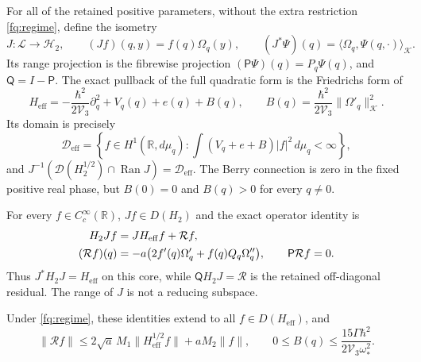 \begin{theorem}
\label{fq:projection}
For all of the retained positive parameters, without the extra
restriction \eqref{fq:regime}, define the isometry
\[
 J:\mathscr L\longrightarrow\mathscr H_2,\qquad
 (Jf)(q,y)=f(q)\Omega_q(y),\qquad
 (J^*\Psi)(q)=\langle\Omega_q,\Psi(q,\cdot)\rangle_{\mathscr K}.
\]
Its range projection is the fibrewise projection
$(\mathsf P\Psi)(q)=P_q\Psi(q)$, and $\mathsf Q=I-\mathsf P$.
The exact pullback of the full quadratic form is the Friedrichs
form of
\begin{equation}\label{fq:effective}
 H_{\mathrm{eff}}=-\frac{\hbar^2}{2\mathcal V_3}\partial_q^2
       +V_q(q)+e(q)+B(q),\qquad
 B(q)=\frac{\hbar^2}{2\mathcal V_3}\|\Omega'_q\|_{\mathscr K}^2.
\end{equation}
Its domain is precisely
\[
 \mathcal D_{\mathrm{eff}}=
 \left\{f\in H^1(\mathbb R,d\mu_q):
  \int(V_q+e+B)|f|^2\,d\mu_q<\infty\right\},
\]
and $J^{-1}(\mathcal D(H_2^{1/2})\cap\operatorname{Ran}J)
=\mathcal D_{\mathrm{eff}}$.
The Berry connection is zero in the fixed positive real phase,
but $B(0)=0$ and $B(q)>0$ for every $q\ne0$.

For every $f\in C_c^\infty(\mathbb R)$, $Jf\in D(H_2)$ and
the exact operator identity is
\begin{align}
 H_2Jf&=JH_{\mathrm{eff}}f+\mathcal Rf,\label{fq:intertwining}\\
 (\mathcal Rf)(q)&=-a\bigl(2f'(q)\Omega'_q
                                  +f(q)Q_q\Omega''_q\bigr),
 \qquad \mathsf P\mathcal Rf=0.\notag
\end{align}
Thus $J^*H_2J=H_{\mathrm{eff}}$ on this core, while
$\mathsf QH_2J=\mathcal R$ is the retained off-diagonal residual.
The range of $J$ is not a reducing subspace.

Under \eqref{fq:regime}, these identities extend to all
$f\in D(H_{\mathrm{eff}})$, and
\begin{equation}\label{fq:residual}
 \|\mathcal Rf\|\leq
  2\sqrt a\,M_1\|H_{\mathrm{eff}}^{1/2}f\|
        +aM_2\|f\|,
 \qquad 0\leq B(q)\leq\frac{15\Gamma\hbar^2}
                                 {2\mathcal V_3\omega_*^2}.
\end{equation}
\end{theorem}

